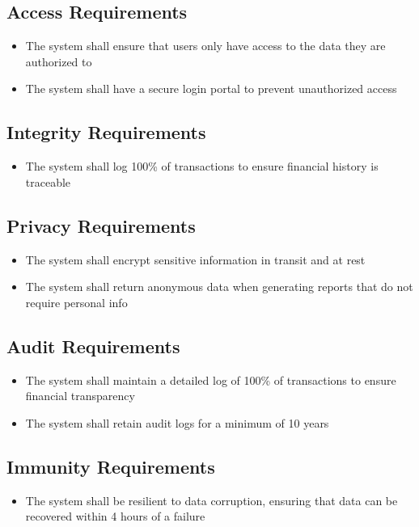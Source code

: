 \documentclass[12pt]{article}
\begin{document}
\subsection{Access Requirements}
\begin{itemize}
    \item The system shall ensure that users only have access to the data they are authorized to
    \item The system shall have a secure login portal to prevent unauthorized access
\end{itemize}
\subsection{Integrity Requirements}
\begin{itemize}
    \item The system shall log 100\% of transactions to ensure financial history is traceable
\end{itemize}
\subsection{Privacy Requirements}
\begin{itemize}
    \item The system shall encrypt sensitive information in transit and at rest
    \item The system shall return anonymous data when generating reports that do not require personal info
\end{itemize}
\subsection{Audit Requirements}
\begin{itemize}
    \item The system shall maintain a detailed log of 100\% of transactions to ensure financial transparency
    \item The system shall retain audit logs for a minimum of 10 years
\end{itemize}
\subsection{Immunity Requirements}
\begin{itemize}
    \item The system shall be resilient to data corruption, ensuring that data can be recovered within 4 hours of a failure
\end{itemize}
\end{document}
